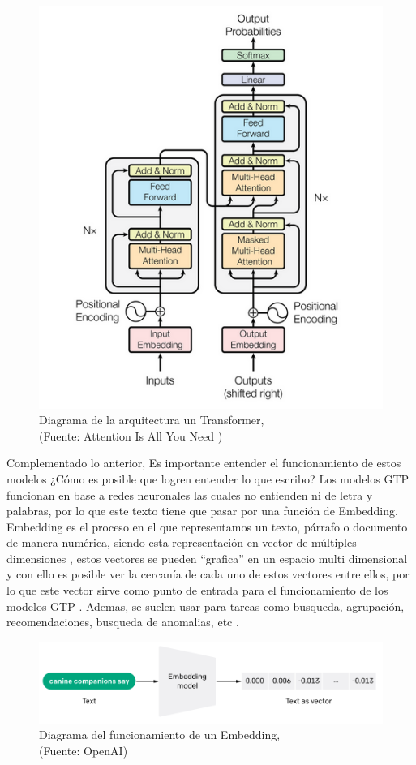 \begin{figure}[ht!]
    \centering
    \includegraphics[width=.5\textwidth]{figures/ea3.png}
    \caption[Diagrama de la arquitectura un Transformer]{Diagrama de la arquitectura un Transformer,\\
    {\scriptsize (Fuente: Attention Is All You Need \cite{aiayn})}}
    \label{fig:ea4}
\end{figure}

\newpage

Complementado lo anterior, Es importante entender el funcionamiento de estos modelos ¿Cómo es posible que logren entender lo que escribo? Los modelos 
GTP funcionan en base a redes neuronales las cuales no entienden ni de letra y palabras, por lo que este texto tiene que pasar por
una función de Embedding. Embedding es el proceso en el que representamos un texto, párrafo o documento de manera numérica, siendo
esta representación en vector de múltiples dimensiones \cite{eb1}, estos vectores se pueden ``grafica'' en un espacio multi dimensional y con 
ello es posible ver la cercanía de cada uno de estos vectores entre ellos, por lo que este vector sirve como punto de entrada para
el funcionamiento de los modelos GTP \cite{eb2}. Ademas, se suelen usar para tareas como busqueda, agrupación, recomendaciones, 
busqueda de anomalias, etc \cite{eb3}.

\begin{figure}[ht!]
    \centering
    \includegraphics[width=.8\textwidth]{figures/huemul4.png}
    \caption[Diagrama del funcionamiento de un Embedding]{Diagrama del funcionamiento de un Embedding,\\
    {\scriptsize (Fuente: OpenAI\cite{openai1})}}
    \label{fig:ea5}
\end{figure}

